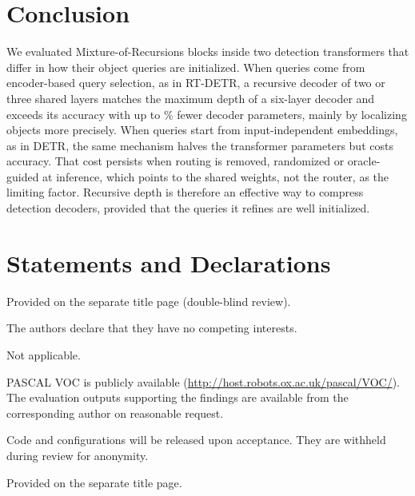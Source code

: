 \documentclass[pdflatex,iicol,sn-basic,Numbered]{sn-jnl}
\begin{document}
\section{Conclusion}\label{sec:conclusion}

We evaluated Mixture-of-Recursions blocks inside two detection transformers that differ in how their object queries are initialized. When queries come from encoder-based query selection, as in RT-DETR, a recursive decoder of two or three shared layers matches the maximum depth of a six-layer decoder and exceeds its accuracy with up to \% fewer decoder parameters, mainly by localizing objects more precisely. When queries start from input-independent embeddings, as in DETR, the same mechanism halves the transformer parameters but costs accuracy. That cost persists when routing is removed, randomized or oracle-guided at inference, which points to the shared weights, not the router, as the limiting factor. Recursive depth is therefore an effective way to compress detection decoders, provided that the queries it refines are well initialized.

\backmatter

\section*{Statements and Declarations}

 Provided on the separate title page (double-blind review).

 The authors declare that they have no competing interests.

 Not applicable.

 PASCAL VOC is publicly available (\url{http://host.robots.ox.ac.uk/pascal/VOC/}). The evaluation outputs supporting the findings are available from the corresponding author on reasonable request.

 Code and configurations will be released upon acceptance. They are withheld during review for anonymity.

 Provided on the separate title page.


\end{document}
